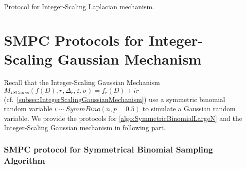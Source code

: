       \begin{protocol}[tbh!]
            \centering
            \caption{\smpc Protocol for Integer-Scaling Laplacian mechanism.}
            \label{prot:ISLap}
      \end{protocol}
      \FloatBarrier




      \section{SMPC Protocols for Integer-Scaling Gaussian Mechanism}
      \label{sec:MPCProtocolforInteger-ScalingGaussianMechanism}
      Recall that the Integer-Scaling Gaussian Mechanism $M_{ISGauss}\left(f\left(D\right),r,\Delta_r,\varepsilon,\sigma\right)=f_r\left(D\right) +ir$ (cf.~\autoref{subsec:IntegerScalingGaussianMechanism}) use a symmetric binomial random variable $i\sim SymmBino\left(n,p=0.5\right)$ to simulate a Gaussian random variable.
      We provide the \smpc protocols for \autoref{algo:SymmetricBinomialLargeN} and the Integer-Scaling Gaussian mechanism in following part.

      \subsubsection{SMPC protocol for Symmetrical Binomial Sampling Algorithm}
      \label{subsec:MPCProtocolforSymmetricalBinomialSamplingAlgorithm}

